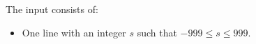 
    The input consists of:
    \begin{itemize}
        \item One line with an integer $s$ such that $-999\leq s\leq 999$.
    \end{itemize}
